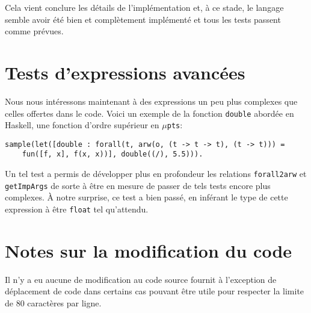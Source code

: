 \documentclass[12pt, titlepage]{article}
\begin{document}
Cela vient conclure les détails de l'implémentation et, à ce stade, le langage
semble avoir été bien et complètement implémenté et tous les tests passent
comme prévues.

\section{Tests d'expressions avancées}
Nous nous intéressons maintenant à des expressions un peu plus complexes que
celles offertes dans le code. Voici un exemple de la fonction \texttt{double}
abordée en Haskell, une fonction d'ordre supérieur en \(\mu\)\texttt{pts}:
\begin{lstlisting}
sample(let([double : forall(t, arw(o, (t -> t -> t), (t -> t))) =
    fun([f, x], f(x, x))], double((/), 5.5))).
\end{lstlisting}
Un tel test a permis de développer plus en profondeur les relations
\texttt{forall2arw} et \texttt{getImpArgs} de sorte à être en mesure de passer
de tels tests encore plus complexes. À notre surprise, ce test a bien passé, en 
inférant le type de cette expression à être \texttt{float} tel qu'attendu.

\section{Notes sur la modification du code}

Il n'y a eu aucune de modification au code source fournit à l'exception de
déplacement de code dans certains cas pouvant être utile pour respecter la
limite de 80 caractères par ligne.
\end{document}

